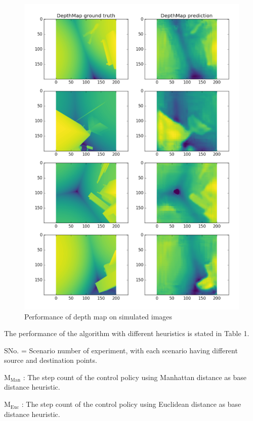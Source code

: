 \begin{figure}
  \includegraphics[width=\linewidth]{images/depthmap2.png}
  \caption{Performance of depth map on simulated images}
  \label{fig:depthmap2}
\end{figure}

The performance of the algorithm with different heuristics is stated in Table 1.
 
{\boldm $ \mathrm{S No.} $ }= Scenario number of experiment, with each scenario having different source and destination points.

{\boldm $ \mathrm{M}_\mathrm{Man} $} : The step count of the control policy using Manhattan distance as base distance heuristic.
 
{\boldm $ \mathrm{M}_\mathrm{Euc} $} : The step count of the control policy using Euclidean distance as base distance heuristic.
 
